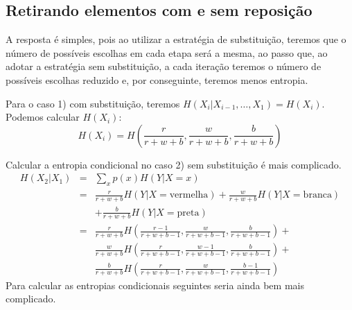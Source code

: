 \subsection{Retirando elementos com e sem reposição}

\begin{questions}

\begin{solution}
  A resposta é simples, pois ao utilizar a estratégia de substituição, teremos que o número de 
  possíveis escolhas em cada etapa será a mesma, ao passo que, ao adotar a estratégia sem substituição,
  a cada iteração teremos o número de possíveis escolhas reduzido e, por conseguinte, teremos menos entropia.

  Para o caso 1) com substituição, teremos $H(X_i \vert X_{i-1}, \ldots, X_1) = H(X_i)$.
  Podemos calcular $H(X_i)$:
  \begin{equation}
  H(X_i) = H \left( \frac{r}{r+w+b}, \frac{w}{r+w+b}, \frac{b}{r+w+b} \right)
  \end{equation}

  Calcular a entropia condicional no caso 2) sem substituição é mais complicado.
  \begin{eqnarray}
  H(X_2 | X_1) &=& \sum_{x} p(x) H(Y|X=x) \nonumber \\
        &=& \frac{r}{r+w+b} H(Y|X=\text{vermelha}) + \frac{w}{r+w+b} H(Y|X=\text{branca}) \nonumber \\
 	&&  + \frac{b}{r+w+b} H(Y|X=\text{preta}) \nonumber \\
        &=& \frac{r}{r+w+b} H \left( \frac{r-1}{r+w+b-1}, \frac{w}{r+w+b-1}, \frac{b}{r+w+b-1} \right) + \nonumber \\
        && \frac{w}{r+w+b} H \left( \frac{r}{r+w+b-1}, \frac{w-1}{r+w+b-1}, \frac{b}{r+w+b-1} \right) + \nonumber \\
        && \frac{b}{r+w+b} H \left( \frac{r}{r+w+b-1}, \frac{w}{r+w+b-1}, \frac{b-1}{r+w+b-1} \right)
  \end{eqnarray}
  Para calcular as entropias condicionais seguintes seria ainda bem mais complicado.


\end{solution}
\end{questions}
